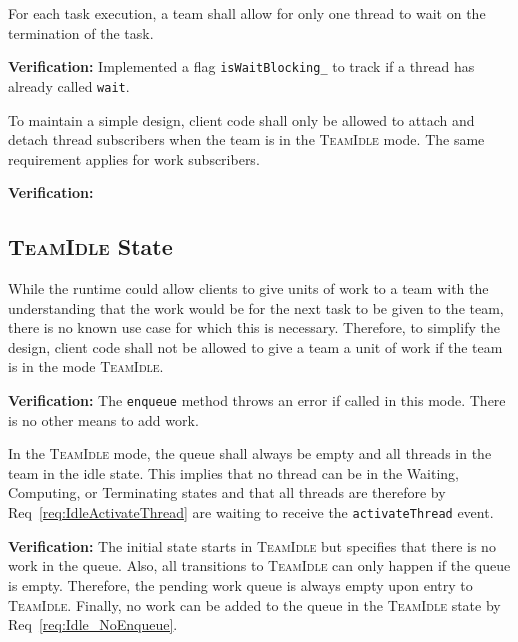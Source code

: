 \documentclass{article}
\newcommand{\TeamIdle}          {\textsc{TeamIdle}}
\begin{document}
\begin{req}
\label{req:Runtime_OneWait}
For each task execution, a team shall allow for only one thread to wait on the
termination of the task.
\end{req}
\textbf{Verification:}\hspace{0.125in}  Implemented a flag
\texttt{isWaitBlocking\_} to track if a thread has already called \texttt{wait}.

\begin{req}
To maintain a simple design, client code shall only be allowed to attach and
detach thread subscribers when the team is in the {\TeamIdle} mode.  The same
requirement applies for work subscribers.
\end{req}
\textbf{Verification:}\hspace{0.125in}

\subsection{{\TeamIdle} State}

\begin{req}
\label{req:Idle_NoEnqueue}
While the runtime could allow clients to give units of work to a team with the
understanding that the work would be for the next task to be given to the team,
there is no known use case for which this is necessary.  Therefore, to simplify
the design, client code shall not be allowed to give a team a unit of work if
the team is in the mode \TeamIdle.  
\end{req}
\textbf{Verification:}\hspace{0.125in}  The \texttt{enqueue} method throws an
error if called in this mode.  There is no other means to add work.\\ 

\begin{req}
In the {\TeamIdle} mode, the queue shall always be empty and all threads in the
team in the idle state.  This implies that no thread can be in the Waiting,
Computing, or Terminating states and that all threads are therefore by
Req~\ref{req:IdleActivateThread} are waiting to receive the
\texttt{activateThread} event.
\end{req}
\textbf{Verification:}\hspace{0.125in}  The initial state starts in {\TeamIdle}
but specifies that there is no work in the queue.  Also, all transitions to
{\TeamIdle} can only happen if the queue is empty.  Therefore, the pending work
queue is always empty upon entry to \TeamIdle.  Finally, no work can be added
to the queue in the {\TeamIdle} state by Req~\ref{req:Idle_NoEnqueue}.\\
\end{document}

